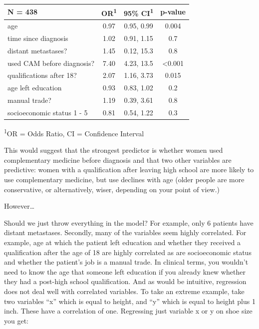 \documentclass[]{book}
\begin{document}
\captionsetup[table]{labelformat=empty,skip=1pt}
\begin{longtable}{lccc}
\toprule
\textbf{N = 438} & \textbf{OR}\textsuperscript{1} & \textbf{95\% CI}\textsuperscript{1} & \textbf{p-value} \\ 
\midrule
age & 0.97 & 0.95, 0.99 & 0.004 \\ 
time since diagnosis & 1.02 & 0.91, 1.15 & 0.7 \\ 
distant metastases? & 1.45 & 0.12, 15.3 & 0.8 \\ 
used CAM before diagnosis? & 7.40 & 4.23, 13.5 & <0.001 \\ 
qualifications after 18? & 2.07 & 1.16, 3.73 & 0.015 \\ 
age left education & 0.93 & 0.83, 1.02 & 0.2 \\ 
manual trade? & 1.19 & 0.39, 3.61 & 0.8 \\ 
socioeconomic status 1 - 5 & 0.81 & 0.54, 1.22 & 0.3 \\ 
\bottomrule
\end{longtable}
\vspace{-5mm}
\begin{minipage}{\linewidth}
\textsuperscript{1}OR = Odds Ratio, CI = Confidence Interval \\ 
\end{minipage}

This would suggest that the strongest predictor is whether women used
complementary medicine before diagnosis and that two other variables are
predictive: women with a qualification after leaving high school are
more likely to use complementary medicine, but use declines with age
(older people are more conservative, or alternatively, wiser, depending
on your point of view.)

However\ldots{}

Should we just throw everything in the model? For example, only 6
patients have distant metastases. Secondly, many of the variables seem
highly correlated. For example, age at which the patient left education
and whether they received a qualification after the age of 18 are highly
correlated as are socioeconomic status and whether the patient's job is
a manual trade. In clinical terms, you wouldn't need to know the age
that someone left education if you already knew whether they had a
post-high school qualification. And as would be intuitive, regression
does not deal well with correlated variables. To take an extreme
example, take two variables ``x'' which is equal to height, and ``y''
which is equal to height plus 1 inch. These have a correlation of one.
Regressing just variable x or y on shoe size you get:
\end{document}
